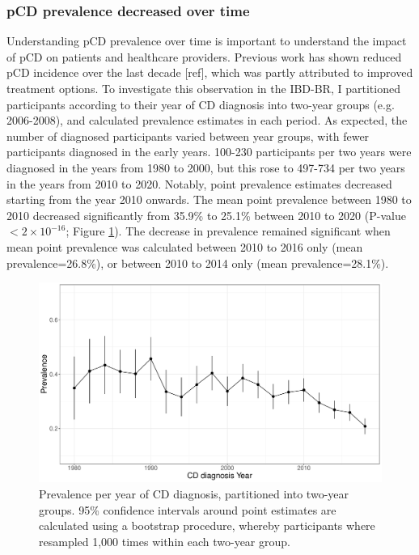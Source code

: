     \subsubsection{pCD prevalence decreased over time}
    Understanding pCD prevalence over time is important to understand the impact of pCD on patients and healthcare providers. Previous work has shown reduced pCD incidence over the last decade [ref], which was partly attributed to improved treatment options. To investigate this observation in the IBD-BR, I partitioned participants according to their year of CD diagnosis into two-year groups (e.g. 2006-2008), and calculated prevalence estimates in each period. As expected, the number of diagnosed participants varied between year groups, with fewer participants diagnosed in the early years. 100-230 participants per two years were diagnosed in the years from 1980 to 2000, but this rose to 497-734 per two years in the years from 2010 to 2020. Notably, point prevalence estimates decreased starting from the year 2010 onwards. The mean point prevalence between 1980 to 2010 decreased significantly from 35.9\% to 25.1\% between 2010 to 2020 (P-value $<2\times10^{-16}$; Figure \ref{fig:pcd_prev}). The decrease in prevalence remained significant when mean point prevalence was calculated between 2010 to 2016 only (mean prevalence=26.8\%), or between 2010 to 2014 only (mean prevalence=28.1\%).\\
    \begin{figure}[htb] 
      \centering    
      \includegraphics[width=1.0\textwidth]{fig2}
      \caption[Figure]{Prevalence per year of CD diagnosis, partitioned into two-year groups. 95\% confidence intervals around point estimates are calculated using a bootstrap procedure, whereby participants where resampled 1,000 times within each two-year group.}
      \label{fig:pcd_prev}
      \end{figure}
 

